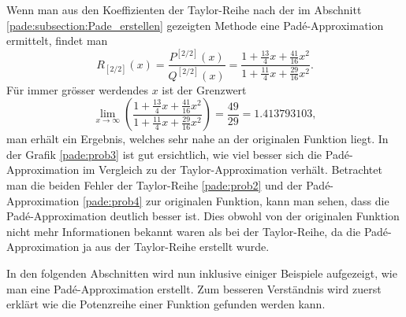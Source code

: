 \begin{beispiel}
Wenn man aus den Koeffizienten der Taylor-Reihe 
nach der im Abschnitt \ref{pade:subsection:Pade_erstellen} gezeigten Methode
eine Padé-Approximation ermittelt, findet man
\begin{equation}
R_{[2/ 2]}(x)
=
\frac{P^{[2/2]}(x)}{Q^{[2/2]}(x)}
=
\frac{1+\frac{13}{4}x+\frac{41}{16}x^2}{1 + \frac{11}{4}x + \frac{29}{16}x^2}.
\label{pade:bspordnung2}
\end{equation}
Für 
immer grösser werdendes $x$ ist der Grenzwert
\begin{equation*}
\lim_{x \to \infty}
\left(
\frac{1+\frac{13}{4}x+\frac{41}{16}x^2}{1 + \frac{11}{4}x + \frac{29}{16}x^2} 
\right)
=
\frac{49}{29} = 1.413793103,
\end{equation*}
man erhält ein Ergebnis, welches sehr nahe an der originalen Funktion liegt. 
In der Grafik \ref{pade:prob3} ist gut ersichtlich, wie viel besser
sich die Padé-Approximation im Vergleich zu der Taylor-Appro\-xi\-ma\-tion
verhält.
Betrachtet man die beiden Fehler der Taylor-Reihe \ref{pade:prob2}
und der Padé-Appro\-xi\-ma\-tion \ref{pade:prob4} zur originalen Funktion,
kann man sehen, dass die Padé-Approximation deutlich besser ist.
Dies obwohl von der originalen Funktion nicht mehr Informationen
bekannt waren als bei der Taylor-Reihe, da
die Padé-Approximation ja aus der Taylor-Reihe erstellt wurde.
\end{beispiel}

In den folgenden Abschnitten wird nun inklusive einiger Beispiele aufgezeigt, wie man eine Padé-Approximation erstellt.
Zum besseren Verständnis wird zuerst erklärt wie die Potenzreihe einer Funktion gefunden werden kann.










